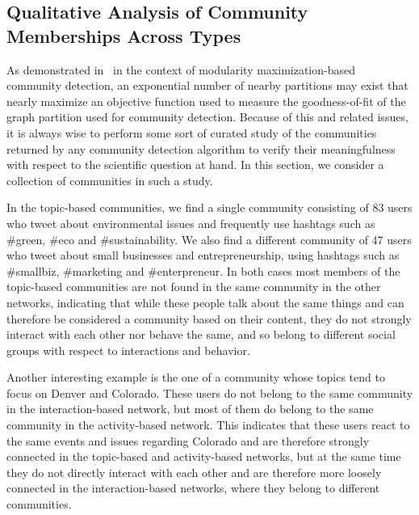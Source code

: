 \subsection{Qualitative Analysis of Community Memberships Across Types}

As demonstrated in~\cite{good2010performance} in the context of modularity maximization-based community detection, an exponential number of nearby partitions may exist that nearly maximize an objective function used to measure the goodness-of-fit of the graph partition used for community detection. Because of this and related issues, it is always wise to perform some sort of curated study of the communities returned by any  community detection algorithm to verify their meaningfulness with respect to the scientific question at hand. In this section, we consider a collection of communities in such a study. 

In the topic-based communities, we find a single community consisting of 83 users who tweet about environmental issues and frequently use hashtags such as \#green, \#eco and \#sustainability. We also find a different community of 47 users who tweet about small businesses and entrepreneurship, using hashtags such as \#smallbiz, \#marketing and \#enterpreneur. In both cases most members of the topic-based communities are not found in the same community in the other networks, indicating that while these people talk about the same things and can therefore be considered a community based on their content, they do not strongly interact with each other nor behave the same, and so belong to different social groups with respect to interactions and behavior.

Another interesting example is the one of a community whose topics tend to focus on Denver and Colorado. These users do not belong to the same community in the interaction-based network, but most of them do belong to the same community in the activity-based network. This indicates that these users react to the same events and issues regarding Colorado and are therefore strongly connected in the topic-based and activity-based networks, but at the same time they do not directly interact with each other and are therefore more loosely connected in the interaction-based networks, where they belong to different communities.